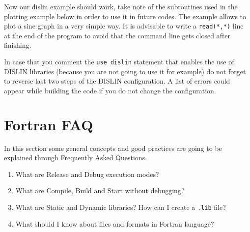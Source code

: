 Now our dislin example should work, take note of the subroutines used in the plotting example below in order to use it in future codes. The example allows to plot a sine graph in a very simple way. It is advisable to write a \texttt{read(*,*)} line at the end of the program to avoid that the command line gets closed after finishing. \vspace{0.5cm}

 

\begin{IN}
    In case that you comment the \texttt{use dislin} statement that enables the use of DISLIN libraries (because you are not going to use it for example) do not forget to reverse last two steps of the DISLIN configuration. A list of errors could appear while building the code if you do not change the configuration. 
\end{IN}


%



    \section{Fortran FAQ}

In this section some general concepts and good practices are going to be explained through Frequently Asked Questions.

\begin{enumerate}[nosep]
    \item What are Release and Debug execution modes?
    \item What are Compile, Build and Start without debugging?
    \item What are Static and Dynamic libraries? How can I create a \texttt{.lib} file?
    \item What should I know about files and formats in Fortran language?
\end{enumerate}


